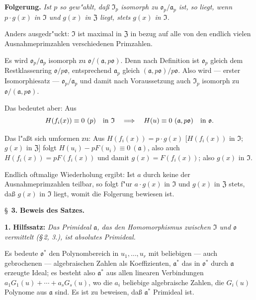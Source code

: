 \medskip\noindent\textbf{Folgerung.}
\textit{Ist $p$ so gew"ahlt, da\ss{} $\mathfrak{I}_p$ isomorph zu $\mathfrak{o}_p/\mathfrak{a}_p$ ist, so liegt, wenn $p \cdot g(x)$ in $\mathfrak{I}$ und $g(x)$ in $\mathfrak{Z}$ liegt, stets $g(x)$ in $\mathfrak{I}$.}

Anders ausgedr"uckt: $\mathfrak{I}$ ist maximal in $\mathfrak{Z}$ in bezug auf alle von den endlich vielen Ausnahmeprimzahlen verschiedenen Primzahlen.

Es wird $\mathfrak{o}_p/\mathfrak{a}_p$ isomorph zu $\mathfrak{o}/(\mathfrak{a}, p\mathfrak{o})$. Denn nach Definition ist $\mathfrak{o}_p$ gleich dem Restklassenring $\mathfrak{o}/p\mathfrak{o}$, entsprechend $\mathfrak{a}_p$ gleich $(\mathfrak{a}, p\mathfrak{o})/p\mathfrak{o}$. Also wird --- erster Isomorphiesatz --- $\mathfrak{o}_p/\mathfrak{a}_p$ und damit nach Voraussetzung auch $\mathfrak{I}_p$ isomorph zu $\mathfrak{o}/(\mathfrak{a}, p\mathfrak{o})$.

Das bedeutet aber: Aus \[
H(f_i(x))\equiv0\ (p)\quad\hbox{in }\mathfrak{I}
\quad\Longrightarrow\quad
H(u)\equiv0\ (\mathfrak{a},p\mathfrak{o})\quad\hbox{in }\mathfrak{o}.
\]

Das l"a\ss t sich umformen zu: Aus $H(f_i(x)) = p \cdot g(x)$ [$H(f_i(x))$ in $\mathfrak{I}$; $g(x)$ in $\mathfrak{Z}$] folgt $H(u_i)-pF(u_i)\equiv0\ (\mathfrak{a})$, also auch $H(f_i(x)) = pF(f_i(x))$ und damit $g(x) = F(f_i(x))$; also $g(x)$ in $\mathfrak{I}$.

Endlich oftmalige Wiederholung ergibt: Ist $a$ durch keine der Ausnahmeprimzahlen teilbar, so folgt f"ur $a \cdot g(x)$ in $\mathfrak{I}$ und $g(x)$ in $\mathfrak{Z}$ stets, da\ss{} $g(x)$ in $\mathfrak{I}$ liegt, womit die Folgerung bewiesen ist.

\bigskip
\S~\textbf{3.}
\textbf{Beweis des Satzes.}

\smallskip

\noindent\textbf{1.} \textbf{Hilfssatz:}
\textit{Das Primideal $\mathfrak{a}$, das den Homomorphismus zwischen $\mathfrak{I}$ und $\mathfrak{o}$ vermittelt (\S\,2, 3.), ist absolutes Primideal.}

Es bedeute $\mathfrak{o}^*$ den Polynombereich in $u_1,\ldots,u_r$ mit beliebigen --- auch gebrochenen --- algebraischen Zahlen als Koeffizienten, $\mathfrak{a}^*$ das in $\mathfrak{o}^*$ durch $\mathfrak{a}$ erzeugte Ideal; es besteht also $\mathfrak{a}^*$ aus allen linearen Verbindungen $a_1 G_1(u) + \cdots + a_s G_s(u)$, wo die $a_i$ beliebige algebraische Zahlen, die $G_i(u)$ Polynome aus $\mathfrak{a}$ sind. Es ist zu beweisen, da\ss{} $\mathfrak{a}^*$ Primideal ist.

